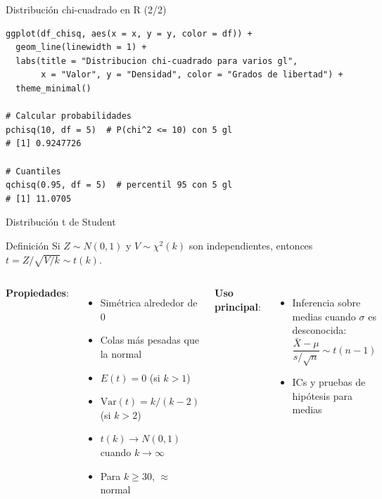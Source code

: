 \documentclass[aspectratio=169, 11pt]{beamer}
\begin{document}
\begin{frame}[fragile]{Distribución chi-cuadrado en R (2/2)}
\begin{lstlisting}
ggplot(df_chisq, aes(x = x, y = y, color = df)) +
  geom_line(linewidth = 1) +
  labs(title = "Distribucion chi-cuadrado para varios gl",
       x = "Valor", y = "Densidad", color = "Grados de libertad") +
  theme_minimal()

# Calcular probabilidades
pchisq(10, df = 5)  # P(chi^2 <= 10) con 5 gl
# [1] 0.9247726

# Cuantiles
qchisq(0.95, df = 5)  # percentil 95 con 5 gl
# [1] 11.0705
\end{lstlisting}
\end{frame}

\begin{frame}{Distribución t de Student}
\begin{block}{Definición}
Si $Z \sim N(0,1)$ y $V \sim \chi^2(k)$ son independientes, entonces
$t = Z/\sqrt{V/k} \sim t(k)$.
\end{block}

\begin{columns}[T]
\textbf{Propiedades}:
\begin{itemize}
\item Simétrica alrededor de 0
\item Colas más pesadas que la normal
\item $E(t) = 0$ (si $k > 1$)
\item $\text{Var}(t) = k/(k-2)$ (si $k > 2$)
\item $t(k) \to N(0,1)$ cuando $k \to \infty$
\item Para $k \geq 30$, $\approx$ normal
\end{itemize}

\textbf{Uso principal}:
\begin{itemize}
\item Inferencia sobre medias cuando $\sigma$ es desconocida:
\[
\frac{\bar{X} - \mu}{s/\sqrt{n}} \sim t(n-1)
\]
\item ICs y pruebas de hipótesis para medias
\end{itemize}
\end{columns}
\end{frame}
\end{document}
